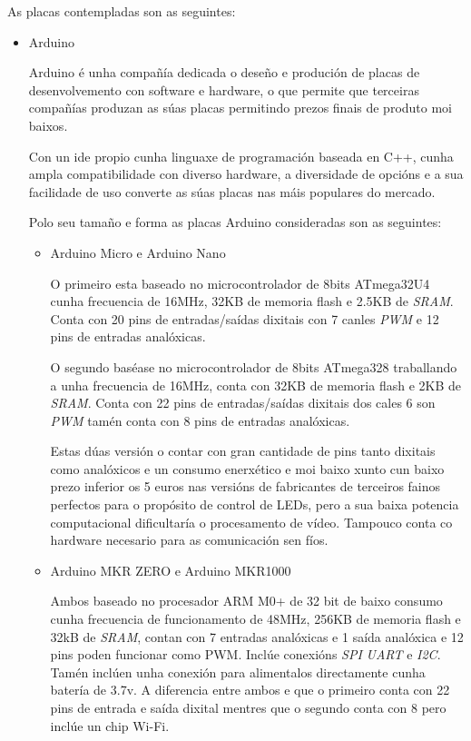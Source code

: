 As placas contempladas son as seguintes:

\begin{itemize}
    \item Arduino

Arduino é unha compañía dedicada o deseño e produción de placas de desenvolvemento con software e hardware, o que permite que terceiras compañías produzan as súas placas permitindo prezos finais de produto moi baixos.

Con un ide propio cunha linguaxe de programación baseada en C++, cunha ampla compatibilidade con diverso hardware, a diversidade de opcións e a sua facilidade de uso converte as súas placas nas máis populares do mercado.

Polo seu tamaño e forma as placas Arduino consideradas son as seguintes:
    \begin{itemize}
        \item Arduino Micro e Arduino Nano

O primeiro esta baseado no microcontrolador de 8bits ATmega32U4 cunha frecuencia de 16MHz, 32KB de memoria flash e 2.5KB de \emph{SRAM}.
Conta con 20 pins de entradas/saídas dixitais con 7 canles \emph{PWM} e 12 pins de entradas analóxicas.

O segundo baséase no microcontrolador de 8bits ATmega328 traballando a unha frecuencia de 16MHz, conta con 32KB de memoria flash e 2KB de \emph{SRAM}. Conta con 22 pins de entradas/saídas dixitais dos cales 6 son \emph{PWM} tamén conta con 8 pins de entradas analóxicas.

Estas dúas versión o contar con gran cantidade de pins tanto dixitais como analóxicos e un consumo enerxético e moi baixo xunto cun baixo prezo inferior os 5 euros nas versións de fabricantes de terceiros fainos perfectos para o propósito de control de LEDs, pero a sua baixa potencia computacional dificultaría o procesamento de vídeo. Tampouco conta co hardware necesario para as comunicación sen fíos.

        \item Arduino MKR ZERO e Arduino MKR1000

Ambos baseado no procesador ARM M0+ de 32 bit de baixo consumo cunha frecuencia de funcionamento de 48MHz, 256KB de memoria flash e 32kB de \emph{SRAM}, contan con 7 entradas analóxicas e 1 saída analóxica e 12 pins poden funcionar como PWM. Inclúe conexións \emph{SPI} \emph{UART} e \emph{I2C}. Tamén inclúen unha conexión para alimentalos directamente cunha batería de 3.7v. A diferencia entre ambos e que o primeiro conta con 22 pins de entrada e saída dixital mentres que o segundo conta con 8 pero inclúe un chip Wi-Fi.


\end{itemize}
\end{itemize}
